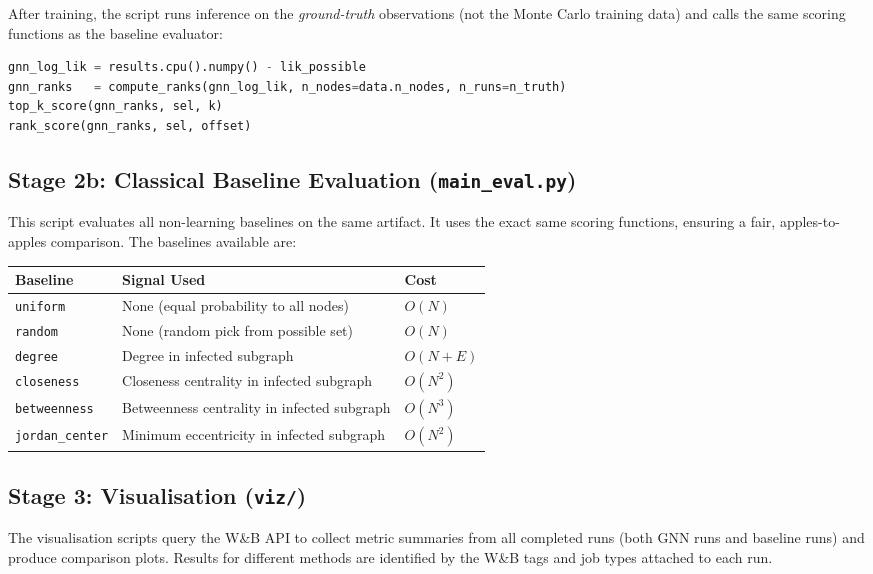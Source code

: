 After training, the script runs inference on the \emph{ground-truth} observations (not the Monte Carlo training data) and calls the same scoring functions as the baseline evaluator:

\begin{lstlisting}[language=Python]
gnn_log_lik = results.cpu().numpy() - lik_possible
gnn_ranks   = compute_ranks(gnn_log_lik, n_nodes=data.n_nodes, n_runs=n_truth)
top_k_score(gnn_ranks, sel, k)
rank_score(gnn_ranks, sel, offset)
\end{lstlisting}

\subsection{Stage 2b: Classical Baseline Evaluation (\texttt{main\_eval.py})}

This script evaluates all non-learning baselines on the same artifact. It uses the exact same scoring functions, ensuring a fair, apples-to-apples comparison. The baselines available are:

\begin{center}
\begin{tabular}{lll}
\toprule
\textbf{Baseline}     & \textbf{Signal Used}                   & \textbf{Cost}    \\
\midrule
\texttt{uniform}      & None (equal probability to all nodes)  & $O(N)$           \\
\texttt{random}       & None (random pick from possible set)   & $O(N)$           \\
\texttt{degree}       & Degree in infected subgraph            & $O(N + E)$       \\
\texttt{closeness}    & Closeness centrality in infected subgraph & $O(N^2)$      \\
\texttt{betweenness}  & Betweenness centrality in infected subgraph & $O(N^3)$    \\
\texttt{jordan\_center} & Minimum eccentricity in infected subgraph & $O(N^2)$    \\
\bottomrule
\end{tabular}
\end{center}

\subsection{Stage 3: Visualisation (\texttt{viz/})}

The visualisation scripts query the W\&B API to collect metric summaries from all completed runs (both GNN runs and baseline runs) and produce comparison plots. Results for different methods are identified by the W\&B tags and job types attached to each run.

